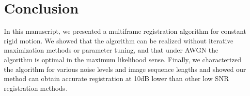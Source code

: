 \documentclass{article}
\begin{document}
\section{Conclusion}
\label{sec:future}

In this manuscript, we presented a multiframe registration algorithm for constant rigid motion.  We showed that the algorithm can be realized without iterative maximization methods or parameter tuning, and that under AWGN the algorithm is optimal in the maximum likelihood sense.  Finally, we characterized the algorithm for various noise levels and image sequence lengths and showed our method can obtain accurate registration at 10dB lower than other low SNR registration methods.

\vfill\pagebreak



\end{document}
